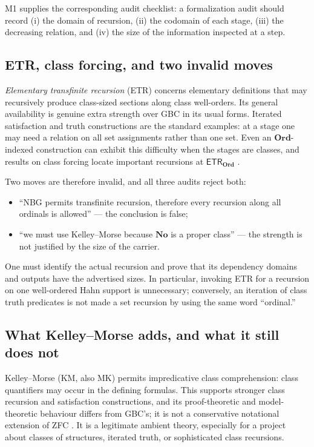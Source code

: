 \documentclass[11pt,letterpaper]{article}
\numberwithin{equation}{section}
\theoremstyle{definition}
\theoremstyle{remark}
\newcommand{\No}{\mathbf{No}}
\newcommand{\Ord}{\mathbf{Ord}}
\newcommand{\ETR}{\mathsf{ETR}}
\begin{document}
M1 supplies the corresponding audit checklist: a formalization audit should
record (i) the domain of recursion, (ii) the codomain of each stage, (iii) the
decreasing relation, and (iv) the size of the information inspected at a step.

\subsection{ETR, class forcing, and two invalid moves}
\label{found:sub:etr}
\emph{Elementary transfinite recursion} (ETR) concerns elementary definitions
that may recursively produce class-sized sections along class well-orders. Its
general availability is genuine extra strength over GBC in its usual forms.
Iterated satisfaction and truth constructions are the standard examples: at a
stage one may need a relation on all set assignments rather than one set. Even
an $\Ord$-indexed construction can exhibit this difficulty when the stages are
classes, and results on class forcing locate important recursions at
$\ETR_{\Ord}$ \cite{found:ClassForcing,found:GitmanHamkins,found:HamkinsETR}.

Two moves are therefore invalid, and all three audits reject both:
\begin{itemize}
\item ``NBG permits transfinite recursion, therefore every recursion along all
ordinals is allowed'' --- the conclusion is false;
\item ``we must use Kelley--Morse because $\No$ is a proper class'' --- the
strength is not justified by the size of the carrier.
\end{itemize}
One must identify the actual recursion and prove that its dependency domains and
outputs have the advertised sizes. In particular, invoking ETR for a recursion
on one well-ordered Hahn support is unnecessary; conversely, an iteration of
class truth predicates is not made a set recursion by using the same word
``ordinal.''

\subsection{What Kelley--Morse adds, and what it still does not}
\label{found:sub:km}
Kelley--Morse (KM, also MK) permits impredicative class comprehension: class
quantifiers may occur in the defining formulas. This supports stronger class
recursion and satisfaction constructions, and its proof-theoretic and
model-theoretic behaviour differs from GBC's; it is not a conservative
notational extension of ZFC \cite{found:Williams,found:ClassForcing}. It is a
legitimate ambient theory, especially for a project about classes of
structures, iterated truth, or sophisticated class recursions.
\end{document}

